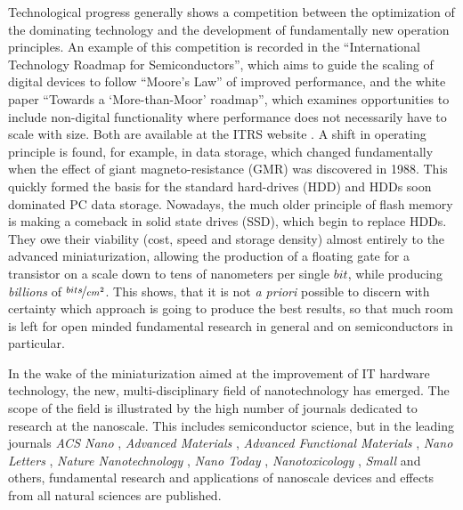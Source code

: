 



Technological progress generally shows a competition between the optimization of the dominating technology and the development of fundamentally new operation principles. An example of this competition is recorded in the ``International Technology Roadmap for Semiconductors'', which aims to guide the scaling of digital devices to follow ``Moore's Law'' of improved performance, and the white paper ``Towards a `More-than-Moor' roadmap'', which examines opportunities to include non-digital functionality where performance does not necessarily have to scale with size. Both are available at the ITRS website  \cite{map_http://www.itrs.net/_2015}. A shift in operating principle is found, for example, in data storage, which changed fundamentally when the effect of giant magneto-resistance (GMR) was discovered in 1988. This quickly formed the basis for the standard hard-drives (HDD) and HDDs soon dominated PC data storage. Nowadays, the much older principle of flash memory is making a comeback in solid state drives (SSD), which begin to replace HDDs. They owe their viability (cost, speed and storage density) almost entirely to the advanced miniaturization, allowing the production of a floating gate for a transistor on a scale down to tens of nanometers per single $bit$, while producing \emph{billions} of $\nicefrac{bits}{cm^{2}}$. This shows, that it is not \emph{a priori} possible to discern with certainty which approach is going to produce the best results, so that much room is left for open minded fundamental research in general and on semiconductors in particular.

In the wake of the miniaturization aimed at the improvement of IT hardware technology, the new, multi-disciplinary field of nanotechnology has emerged. The scope of the field is illustrated by the high number of journals dedicated to research at the nanoscale. This includes semiconductor science, but in the leading journals \emph{ACS Nano} \cite{acs_nano_http://pubs.acs.org/journal/ancac3_2015}, \emph{Advanced Materials} \cite{advanced_materials_http://www.advmat./_2015}, \emph{Advanced Functional Materials} \cite{advanced_functional_materials_http://onlinelibrary.wiley.com/journal/10.1002/issn1616-3028_2015}, \emph{Nano Letters} \cite{nano_letters_http://pubs.acs.org/journal/nalefd_2015}, \emph{Nature Nanotechnology} \cite{nature_nanotechnology_http://www.nature.com/nnano_2015}, \emph{Nano Today} \cite{nano_today_http://journals.elsevier.com/17480132/nano-today/_2015}, \emph{Nanotoxicology} \cite{nanotoxicology_http://www.informahealthcare.com/nan_2015}, \emph{Small} \cite{small_http://www.small-journal.com/_2015} and others, fundamental research and applications of nanoscale devices and effects from all natural sciences are published.

